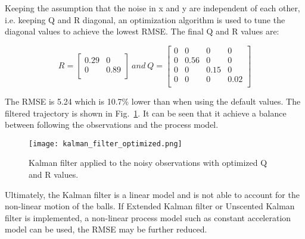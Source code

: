 \documentclass{report}
\begin{document}
Keeping the assumption that the noise in x and y are independent of each other, i.e. keeping Q and R diagonal, an optimization algorithm is used to tune the diagonal values to achieve the lowest RMSE. The final Q and R values are:

\begin{equation}
R = \begin{bmatrix} 
    0.29 & 0    \\
    0    & 0.89 \\
\end{bmatrix}\ and\ Q = \begin{bmatrix} 
    0 & 0    & 0    & 0    \\
    0 & 0.56 & 0    & 0    \\
    0 & 0    & 0.15 & 0    \\
    0 & 0    & 0    & 0.02 \\
\end{bmatrix}
\end{equation}

The RMSE is 5.24 which is 10.7\% lower than when using the default values. The filtered trajectory is shown in Fig.~\ref{fig:kalman_filter_optimized}. It can be seen that it achieve a balance between following the observations and the process model.

\begin{figure}[ht]
    \centering
    \texttt{[image: kalman\_filter\_optimized.png]}
    \caption{Kalman filter applied to the noisy observations with optimized Q and R values.}
    \label{fig:kalman_filter_optimized}
\end{figure}

Ultimately, the Kalman filter is a linear model and is not able to account for the non-linear motion of the balls. If Extended Kalman filter\cite{julierNewExtensionKalman1997} or Unscented Kalman filter\cite{wanUnscentedKalmanFilter2000} is implemented, a non-linear process model  such as constant acceleration model can be used, the RMSE may be further reduced.

\printbibliography
\end{document}
